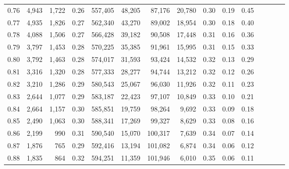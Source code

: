 \begin{tabular}{rrrcrrrrrrrrrrr}
0.76 &   4,943 &  1,722 &                                       0.26 &  557,405 &   48,205 &   87,176 &   20,780 &  0.30 &  0.19 &                         0.45 \\
0.77 &   4,935 &  1,826 &                                       0.27 &  562,340 &   43,270 &   89,002 &   18,954 &  0.30 &  0.18 &                         0.40 \\
0.78 &   4,088 &  1,506 &                                       0.27 &  566,428 &   39,182 &   90,508 &   17,448 &  0.31 &  0.16 &                         0.36 \\
0.79 &   3,797 &  1,453 &                                       0.28 &  570,225 &   35,385 &   91,961 &   15,995 &  0.31 &  0.15 &                         0.33 \\
0.80 &   3,792 &  1,463 &                                       0.28 &  574,017 &   31,593 &   93,424 &   14,532 &  0.32 &  0.13 &                         0.29 \\
0.81 &   3,316 &  1,320 &                                       0.28 &  577,333 &   28,277 &   94,744 &   13,212 &  0.32 &  0.12 &                         0.26 \\
0.82 &   3,210 &  1,286 &                                       0.29 &  580,543 &   25,067 &   96,030 &   11,926 &  0.32 &  0.11 &                         0.23 \\
0.83 &   2,644 &  1,077 &                                       0.29 &  583,187 &   22,423 &   97,107 &   10,849 &  0.33 &  0.10 &                         0.21 \\
0.84 &   2,664 &  1,157 &                                       0.30 &  585,851 &   19,759 &   98,264 &    9,692 &  0.33 &  0.09 &                         0.18 \\
0.85 &   2,490 &  1,063 &                                       0.30 &  588,341 &   17,269 &   99,327 &    8,629 &  0.33 &  0.08 &                         0.16 \\
0.86 &   2,199 &    990 &                                       0.31 &  590,540 &   15,070 &  100,317 &    7,639 &  0.34 &  0.07 &                         0.14 \\
0.87 &   1,876 &    765 &                                       0.29 &  592,416 &   13,194 &  101,082 &    6,874 &  0.34 &  0.06 &                         0.12 \\
0.88 &   1,835 &    864 &                                       0.32 &  594,251 &   11,359 &  101,946 &    6,010 &  0.35 &  0.06 &                         0.11 \\

\end{tabular}
